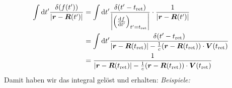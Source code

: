 %
%
%
%
%
%
\begin{align*}
\int \textrm{d} t' \frac{\delta(f(t'))}{|\bm{r} - \bm{R}(t')|} &= \int \textrm{d} t' \frac{\delta(t' - t_{\textrm{ret}})}{\left|\left(\frac{\textrm{d} f}{\textrm{d} t'}\right)_{t' = t_{\textrm{ret}}}\right|} \cdot \frac{1}{| \bm{r} - \bm{R}(t')|}\\
&= \int \textrm{d} t' \frac{\delta(t' - t_{\textrm{ret}})}{|\bm{r} - \bm{R}(t_{\textrm{ret}})| - \frac{1}{c} (\bm{r} - \bm{R}(t_{\textrm{ret}})) \cdot \bm{V}(t_{\textrm{ret}})}\\
&= \frac{1}{|\bm{r} - \bm{R}(t_{\textrm{ret}})| - \frac{1}{c} (\bm{r} - \bm{R}(t_{\textrm{ret}})) \cdot \bm{V}(t_{\textrm{ret}})}
\end{align*}
Damit haben wir das integral gelöst und erhalten:
\noindent
\emph{Beispiele:}
